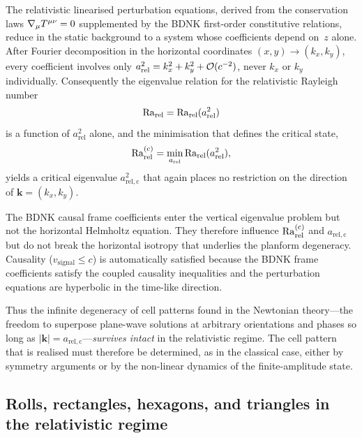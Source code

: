 The relativistic linearised perturbation equations, derived from the
conservation laws $\nabla_{\mu} T^{\mu\nu}=0$ supplemented by the
BDNK first-order constitutive relations, reduce in the static
background to a system whose coefficients depend on~$z$ alone.
After Fourier decomposition in the horizontal coordinates
$(x,y)\to(k_{x},k_{y})$, every coefficient involves only
$a_{\mathrm{rel}}^{2}=k_{x}^{2}+k_{y}^{2}+\mathcal{O}(c^{-2})$,
never $k_{x}$ or $k_{y}$ individually.  Consequently the
eigenvalue relation for the relativistic Rayleigh number
\begin{equation}
\label{eq:rel-Ra-marginal}
\mathrm{Ra}_{\mathrm{rel}} = \mathrm{Ra}_{\mathrm{rel}}(a_{\mathrm{rel}}^{2})
\end{equation}
is a function of $a_{\mathrm{rel}}^{2}$ alone, and the
minimisation that defines the critical state,
\begin{equation}
\label{eq:rel-Ra-crit}
\mathrm{Ra}_{\mathrm{rel}}^{(\mathrm{c})} = \min_{a_{\mathrm{rel}}}\mathrm{Ra}_{\mathrm{rel}}(a_{\mathrm{rel}}^{2}),
\end{equation}
yields a critical eigenvalue $a_{\mathrm{rel,c}}^{2}$ that again
places no restriction on the direction of $\mathbf{k}=(k_{x},k_{y})$.

\begin{causalitycheck}
The BDNK causal frame coefficients enter the vertical eigenvalue
problem but not the horizontal Helmholtz equation.  They therefore
influence $\mathrm{Ra}_{\mathrm{rel}}^{(\mathrm{c})}$ and $a_{\mathrm{rel,c}}$ but do
not break the horizontal isotropy that underlies the planform
degeneracy.
Causality ($v_{\mathrm{signal}}\le c$) is automatically satisfied
because the BDNK frame coefficients satisfy the coupled
causality inequalities and the perturbation equations are
hyperbolic in the time-like direction.
\end{causalitycheck}

Thus the infinite degeneracy of cell patterns found in the Newtonian
theory---the freedom to superpose plane-wave solutions at arbitrary
orientations and phases so long as
$|\mathbf{k}|=a_{\mathrm{rel,c}}$---\emph{survives intact} in the
relativistic regime.  The cell pattern that is realised must therefore
be determined, as in the classical case, either by symmetry arguments
or by the non-linear dynamics of the finite-amplitude state.

\subsection{Rolls, rectangles, hexagons, and triangles in the
  relativistic regime}\label{sec:rel-16-patterns}

